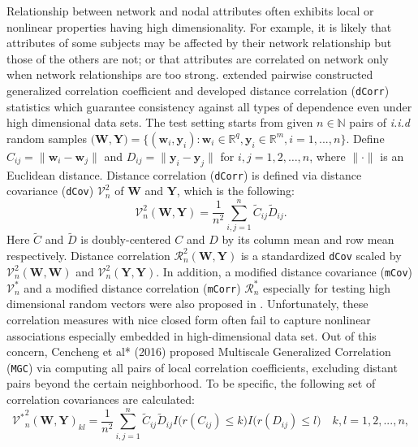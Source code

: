 \documentclass[12pt]{article}
\theoremstyle{definition}
\begin{document}
Relationship between network and nodal attributes often exhibits local or nonlinear properties having high dimensionality. For example, it is likely that attributes of some subjects may be affected by their network relationship but those of the others are not; or that attributes are correlated on network only when network relationships are too strong. \cite{szekely2007measuring} extended pairwise constructed generalized correlation coefficient and developed distance correlation (\texttt{dCorr}) statistics which guarantee consistency against all types of dependence even under high dimensional data sets. The test setting starts from given $n \in \mathbb{N}$ pairs of \textit{i.i.d} random samples $\big(  \mathbf{W}, \mathbf{Y}  \big)  = \{ (\mathbf{w}_{i}, \mathbf{y}_{i}) : \mathbf{w}_{i} \in \mathbb{R}^{q}, \mathbf{y}_{i} \in \mathbb{R}^{m}, i = 1,...,n \}$. Define $C_{ij} = \parallel \mathbf{w}_{i} - \mathbf{w}_{j} \parallel$ and $D_{ij} = \parallel \mathbf{y}_{i} - \mathbf{y}_{j} \parallel$ for $i,j=1,2, \ldots ,n$, where $\parallel \cdot \parallel$ is an Euclidean distance. Distance correlation (\texttt{dCorr}) is defined via distance covariance (\texttt{dCov}) $\mathcal{V}^2_{n}$ of $\mathbf{W}$ and $\mathbf{Y}$, which is the following: 
\begin{equation}	 
\mathcal{V}^2_{n}(\mathbf{W}, \mathbf{Y}) = \frac{1}{n^2} \sum\limits_{i,j=1}^{n} \tilde{C}_{ij} \tilde{D}_{ij}.
\end{equation}
Here $\tilde{C}$ and $\tilde{D}$ is doubly-centered $C$ and $D$ by its column mean and row mean respectively. Distance correlation $\mathcal{R}^{2}_{n}(\mathbf{W}, \mathbf{Y})$ is a standardized \texttt{dCov} scaled by $\mathcal{V}^2_{n}(\mathbf{W}, \mathbf{W})$ and $\mathcal{V}^2_{n}(\mathbf{Y}, \mathbf{Y}).$ In addition, a modified distance covariance (\texttt{mCov}) $\mathcal{V}^*_{n}$ and a modified distance correlation (\texttt{mCorr}) $\mathcal{R}^{*}_{n}$ especially for testing high dimensional random vectors were also proposed in \cite{szekely2013distance}. Unfortunately, these correlation measures with nice closed form often fail to capture nonlinear associations especially embedded in high-dimensional data set. Out of this concern, Cencheng et al* (2016) proposed Multiscale Generalized Correlation (\texttt{MGC}) via computing all pairs of local correlation coefficients, excluding distant pairs beyond the certain neighborhood. To be specific, the following set of correlation covariances are calculated:
\begin{equation}
\label{eq:MGC}
{\mathcal{V}^{*}}^2_{n} (\mathbf{W}, \mathbf{Y})_{kl} = \frac{1}{n^2} \sum\limits_{i,j=1}^{n} \tilde{C}_{ij} \tilde{D}_{ij} I \big( r(C_{ij}) \leq k \big) I \big( r(D_{ij}) \leq l  \big) \quad k,l=1,2,..., n ,
\end{equation}
\end{document}
